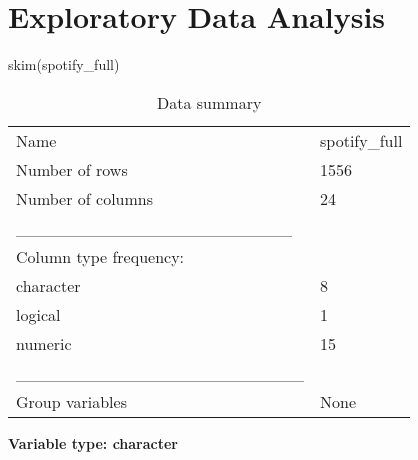 \documentclass[
]{article}
\newenvironment{Shaded}{\begin{snugshade}}{\end{snugshade}}
\newcommand{\FunctionTok}[1]{\textcolor[rgb]{0.00,0.00,0.00}{#1}}
\newcommand{\NormalTok}[1]{#1}
\begin{document}
\hypertarget{exploratory-data-analysis}{%
\section{Exploratory Data Analysis}\label{exploratory-data-analysis}}

\begin{Shaded}
\begin{Highlighting}[]
\FunctionTok{skim}\NormalTok{(spotify\_full)}
\end{Highlighting}
\end{Shaded}

\begin{longtable}[]{@{}ll@{}}
\caption{Data summary}\tabularnewline
\toprule
\endhead
Name & spotify\_full \\
Number of rows & 1556 \\
Number of columns & 24 \\
\_\_\_\_\_\_\_\_\_\_\_\_\_\_\_\_\_\_\_\_\_\_\_ & \\
Column type frequency: & \\
character & 8 \\
logical & 1 \\
numeric & 15 \\
\_\_\_\_\_\_\_\_\_\_\_\_\_\_\_\_\_\_\_\_\_\_\_\_ & \\
Group variables & None \\
\bottomrule
\end{longtable}

\textbf{Variable type: character}
\end{document}
